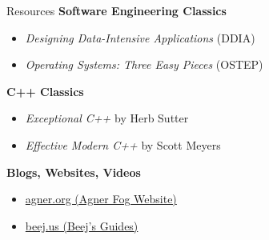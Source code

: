 \begin{frame}{Resources}
  \textbf{Software Engineering Classics}
  \begin{itemize}
    \item \textit{Designing Data-Intensive Applications} (DDIA)
    \item \textit{Operating Systems: Three Easy Pieces} (OSTEP)
  \end{itemize}

  \textbf{C++ Classics}
  \begin{itemize}
    \item \textit{Exceptional C++} by Herb Sutter
    \item \textit{Effective Modern C++} by Scott Meyers
  \end{itemize}

  \textbf{Blogs, Websites, Videos}
  \begin{itemize}
    \item \href{https://agner.org}{agner.org (Agner Fog Website)}
    \item \href{https://beej.us/guide/}{beej.us (Beej's Guides)}
  \end{itemize}
\end{frame}

